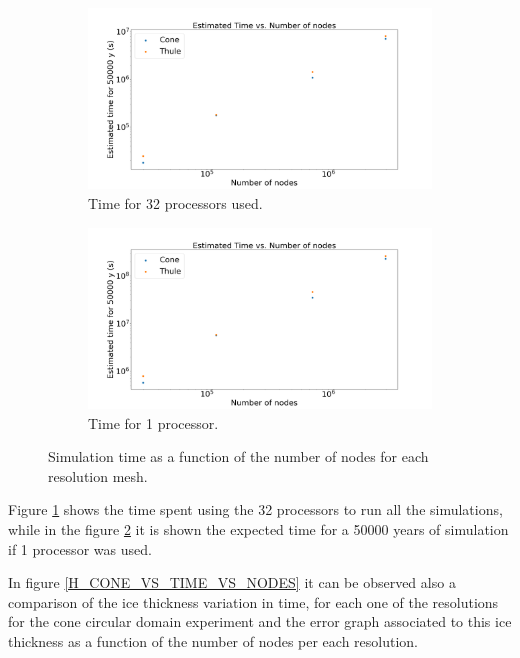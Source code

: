\documentclass{article}
\begin{document}
\begin{figure}[!h]
	\centering
	\begin{subfigure}{.5\textwidth}
		\centering
		\includegraphics[width=1.1\linewidth]{../fig/Figure_Time_vs_nodes_Segundos.png}
		\caption{Time for 32 processors used.}
		\label{32_proce}
	\end{subfigure}%
	\begin{subfigure}{.5\textwidth}
		\centering
		\includegraphics[width=1.1\linewidth]{../fig/Figure_Time_vs_nodes_32.png}
		\caption{Time for 1 processor.}
		\label{1_proce}
	\end{subfigure}
	\caption{Simulation time as a function of the number of nodes for each resolution mesh.}
	\label{Computation time}
\end{figure}

Figure \ref{32_proce} shows the time spent using the 32 processors to run all the simulations, while in the figure \ref{1_proce} it is shown the expected time for a 50000 years of simulation if 1 processor was used. 

In figure \ref{H_CONE_VS_TIME_VS_NODES} it can be observed also a comparison of the ice thickness variation in time, for each one of the resolutions for the cone circular domain experiment and the error graph associated to this ice thickness as a function of the number of nodes per each resolution.
\end{document}
